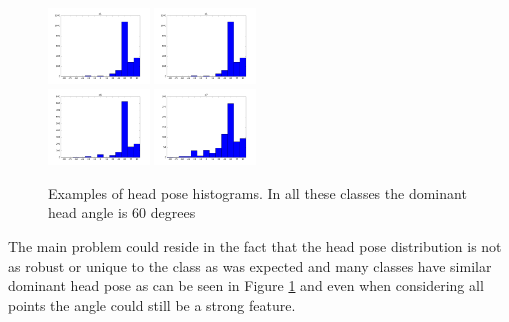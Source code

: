 \documentclass[10pt,twocolumn,letterpaper]{article}
\begin{document}
\begin{figure}[h]
	\centering
	\includegraphics[width=0.24\textwidth]{headpose_evaluation_c1}%
	\includegraphics[width=0.24\textwidth]{headpose_evaluation_c1}\\ \vspace{0.01\textwidth}
	\includegraphics[width=0.24\textwidth]{headpose_evaluation_c6}%
	\includegraphics[width=0.24\textwidth]{headpose_evaluation_c7}
	\caption{Examples of head pose histograms. In all these classes the dominant head angle is 60 degrees}
	\label{head_pose_distribution}
\end{figure}

The main problem could reside in the fact that the head pose distribution is not as robust or unique to the class as was expected and many classes have similar dominant head pose as can be seen in Figure \ref{head_pose_distribution} and even when considering all points the angle could still be a strong feature. 
\end{document}
